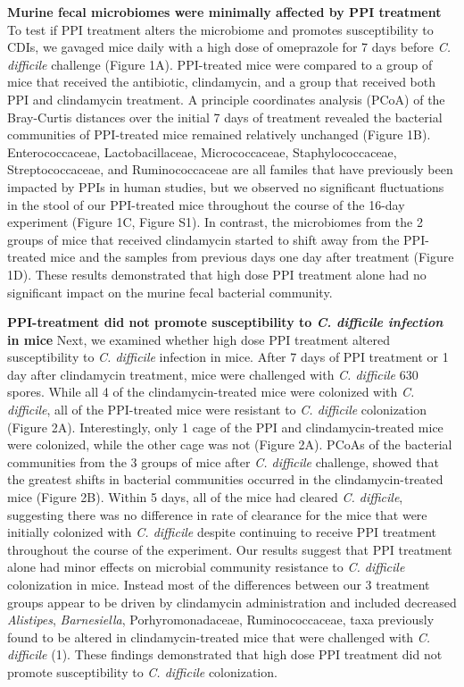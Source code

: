 \documentclass[11pt,]{article}
\begin{document}
\textbf{Murine fecal microbiomes were minimally affected by PPI
treatment } To test if PPI treatment alters the microbiome and promotes
susceptibility to CDIs, we gavaged mice daily with a high dose of
omeprazole for 7 days before \emph{C. difficile} challenge (Figure 1A).
PPI-treated mice were compared to a group of mice that received the
antibiotic, clindamycin, and a group that received both PPI and
clindamycin treatment. A principle coordinates analysis (PCoA) of the
Bray-Curtis distances over the initial 7 days of treatment revealed the
bacterial communities of PPI-treated mice remained relatively unchanged
(Figure 1B). Enterococcaceae, Lactobacillaceae, Micrococcaceae,
Staphylococcaceae, Streptococcaceae, and Ruminococcaceae are all familes
that have previously been impacted by PPIs in human studies, but we
observed no significant fluctuations in the stool of our PPI-treated
mice throughout the course of the 16-day experiment (Figure 1C, Figure
S1). In contrast, the microbiomes from the 2 groups of mice that
received clindamycin started to shift away from the PPI-treated mice and
the samples from previous days one day after treatment (Figure 1D).
These results demonstrated that high dose PPI treatment alone had no
significant impact on the murine fecal bacterial community.

\textbf{PPI-treatment did not promote susceptibility to \emph{C.
difficile infection} in mice} Next, we examined whether high dose PPI
treatment altered susceptibility to \emph{C. difficile} infection in
mice. After 7 days of PPI treatment or 1 day after clindamycin
treatment, mice were challenged with \emph{C. difficile} 630 spores.
While all 4 of the clindamycin-treated mice were colonized with \emph{C.
difficile}, all of the PPI-treated mice were resistant to \emph{C.
difficile} colonization (Figure 2A). Interestingly, only 1 cage of the
PPI and clindamycin-treated mice were colonized, while the other cage
was not (Figure 2A). PCoAs of the bacterial communities from the 3
groups of mice after \emph{C. difficile} challenge, showed that the
greatest shifts in bacterial communities occurred in the
clindamycin-treated mice (Figure 2B). Within 5 days, all of the mice had
cleared \emph{C. difficile}, suggesting there was no difference in rate
of clearance for the mice that were initially colonized with \emph{C.
difficile} despite continuing to receive PPI treatment throughout the
course of the experiment. Our results suggest that PPI treatment alone
had minor effects on microbial community resistance to \emph{C.
difficile} colonization in mice. Instead most of the differences between
our 3 treatment groups appear to be driven by clindamycin administration
and included decreased \emph{Alistipes}, \emph{Barnesiella},
Porhyromonadaceae, Ruminococcaceae, taxa previously found to be altered
in clindamycin-treated mice that were challenged with \emph{C.
difficile} (1). These findings demonstrated that high dose PPI treatment
did not promote susceptibility to \emph{C. difficile} colonization.
\end{document}

